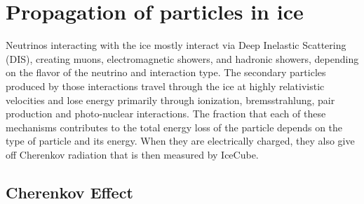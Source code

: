 \section{Propagation of particles in ice}
\label{sec:particle-interactions}
Neutrinos interacting with the ice mostly interact via Deep Inelastic Scattering (DIS), creating muons, electromagnetic showers, and hadronic showers, depending on the flavor of the neutrino and interaction type.
The secondary particles produced by those interactions travel through the ice at highly relativistic velocities and lose energy primarily through ionization, bremsstrahlung, pair production and photo-nuclear interactions. The fraction that each of these mechanisms contributes to the total energy loss of the particle depends on the type of particle and its energy. When they are electrically charged, they also give off Cherenkov radiation that is then measured by IceCube.

\subsection{Cherenkov Effect}

